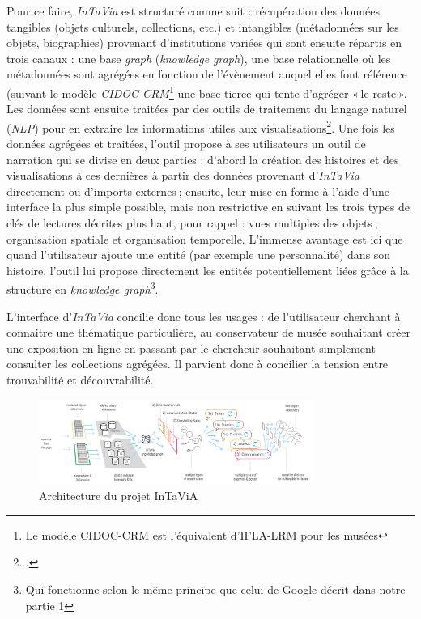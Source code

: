 Pour ce faire, \textit{InTaVia} est structuré comme suit : récupération des données tangibles (objets culturels, collections, etc.) et intangibles (métadonnées sur les objets, biographies) provenant d’institutions variées qui sont ensuite répartis en trois canaux : une base \textit{graph} (\textit{knowledge graph}), une base relationnelle où les métadonnées sont agrégées en fonction de l’évènement auquel elles font référence (suivant le modèle \textit{CIDOC-CRM}\footnote{Le modèle CIDOC-CRM est l'équivalent d'IFLA-LRM pour les musées} une base tierce qui tente d’agréger « le reste ». Les données sont ensuite traitées par des outils de traitement du langage naturel (\textit{NLP}) pour en extraire les informations utiles aux visualisations\footcite{noauthor_overall_nodate}. Une fois les données agrégées et traitées, l’outil propose à ses utilisateurs un outil de narration qui se divise en deux parties : d’abord la création des histoires et des visualisations à ces dernières à partir des données provenant d’\textit{InTaVia} directement ou d’imports externes ; ensuite, leur mise en forme à l’aide d’une interface la plus simple possible, mais non restrictive en suivant les trois types de clés de lectures décrites plus haut, pour rappel : vues multiples des objets ; organisation spatiale et organisation temporelle. L’immense avantage est ici que quand l’utilisateur ajoute une entité (par exemple une personnalité) dans son histoire, l’outil lui propose directement les entités potentiellement liées grâce à la structure en \textit{knowledge graph}\footnote{Qui fonctionne selon le même principe que celui de Google décrit dans notre partie 1}.

L’interface d’\textit{InTaVia} concilie donc tous les usages : de l’utilisateur cherchant à connaitre une thématique particulière, au conservateur de musée souhaitant créer une exposition en ligne en passant par le chercheur souhaitant simplement consulter les collections agrégées. Il parvient donc à concilier la tension entre trouvabilité et découvrabilité.


\begin{figure}[h!]
	\centering
	\includegraphics[width=0.8\textwidth]{images/image18.png}
	\caption{Architecture du projet InTaViA}
	\label{fig:image18}
\end{figure}


